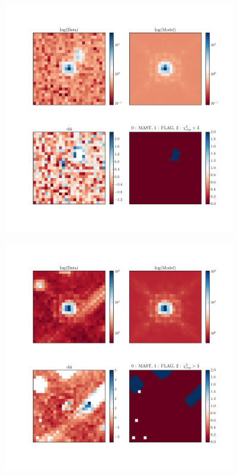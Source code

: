 \begin{figure}
\includegraphics[width=0.9\textwidth]{figures/wfc3ir/example7.pdf}
\caption{\label{fig:validation_2} }
\end{figure}

\begin{figure}
\includegraphics[width=0.9\textwidth]{figures/wfc3ir/example11.pdf}
\caption{\label{fig:validation_3} }
\end{figure}


